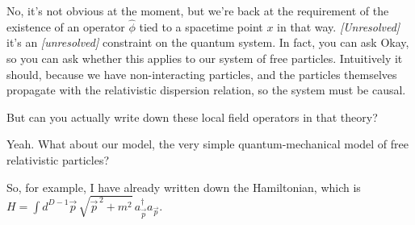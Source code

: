 No, it's not obvious at the moment, but we're back at the requirement of the
existence of an operator $\hat\phi$ tied to a spacetime point $x$ in that way.
\textit{[Unresolved]} it's an \textit{[unresolved]} constraint on the quantum
system. In fact, you can ask
Okay, so
you can ask whether this applies to our system of free particles. Intuitively
it should, because we have non-interacting particles, and the particles
themselves propagate with the relativistic dispersion relation, so the system
must be causal.

But can you actually write down these local field operators in that theory?

Yeah. What about our model, the very simple quantum-mechanical model of free
relativistic particles?

So, for example, I have already written down the Hamiltonian, which is
$H=\int d^{D-1}\vec p\,\sqrt{\vec p^{\,2}+m^2}\,
a_{\vec p}^{\dagger}a_{\vec p}$.


